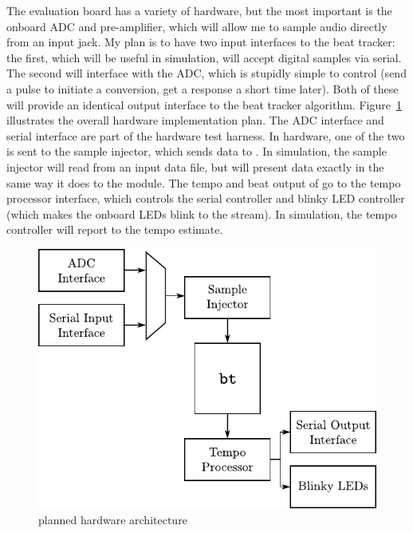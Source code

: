 \documentclass[letterpaper]{article}
\begin{document}
    The evaluation board has a variety of hardware, but the most important is
    the onboard ADC and pre-amplifier, which will allow me to sample audio
    directly from an input jack.  My plan is to have two input interfaces to
    the beat tracker: the first, which will be useful in simulation, will
    accept digital samples via serial.  The second will interface with the ADC,
    which is stupidly simple to control (send a pulse to initiate a conversion,
    get a response a short time later).  Both of these will provide an
    identical output interface to the beat tracker algorithm.
    Figure~\ref{fig:implementation} illustrates the overall hardware
    implementation plan.  The ADC interface and serial interface are part of
    the hardware test harness.  In hardware, one of the two is sent to the
    sample injector, which sends data to \projname.  In simulation, the sample
    injector will read from an input data file, but will present data exactly
    in the same way it does to the \projname module.  The tempo and beat output
    of \projname go to the tempo processor interface, which controls the serial
    controller and blinky LED controller (which makes the onboard LEDs blink to
    the stream).  In simulation, the tempo controller will report to
     the tempo estimate.

    \begin{figure}
        \centering
        \includegraphics{fig/implementation.pdf}
        \caption{planned hardware architecture}
        \label{fig:implementation}
    \end{figure}
\end{document}
